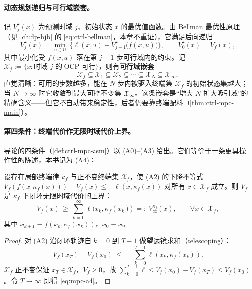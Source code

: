 \paragraph{动态规划递归与可行域嵌套。}
记 $V_j^\star(x)$ 为预测时域 $j$、初始状态 $x$ 的最优值函数。由 Bellman 最优性原理（见 \cref{ch:dp-hjb} 的 \cref{eq:ctrl-bellman}，本章不重证），它满足后向递归
\begin{equation}
  V_j^\star(x)=\min_{u\in\mathbb U}\ \big\{\ell(x,u)+V_{j-1}^\star\big(f(x,u)\big)\big\},\qquad V_0^\star(x)=V_f(x),
  \label{eq:mpc-dp-recursion}
\end{equation}
其中最小化受 $f(x,u)$ 落在第 $j-1$ 步可行域内的约束。记 $\mathcal X_j:=\{x:\text{时域 }j\text{ 的 OCP 可行}\}$，则有\textbf{可行域嵌套}
\begin{equation}
  \mathcal X_f\subseteq \mathcal X_1\subseteq \mathcal X_2\subseteq\cdots\subseteq \mathcal X_N\subseteq \mathcal X_\infty,
  \label{eq:mpc-feasible-nest}
\end{equation}
直觉清晰：可用的步数越多，能在 $N$ 步内被驱入终端集 $\mathcal X_f$ 的初始状态集越大；当 $N\to\infty$ 时它收敛到最大可控不变集 $\mathcal X_\infty$。这条嵌套是“增大 $N$ 扩大吸引域”的精确含义——但它\emph{不}自动带来稳定性，后者仍要靠终端配料（\cref{thm:ctrl-mpc-main}）。

\paragraph{第四条件：终端代价作无限时域代价上界。}
导论的四条件（\cref{def:ctrl-mpc-asm}）以 (A0)--(A3) 给出。它们等价于一条更具操作性的陈述，本书记为 (A4)：

\begin{proposition}[终端代价的无限时域上界刻画]
\label{prop:mpc-a4}
设存在局部终端律 $\kappa_f$ 与正不变终端集 $\mathcal X_f$，使 (A2) 的下降不等式 $V_f(f(x,\kappa_f(x)))-V_f(x)\le -\ell(x,\kappa_f(x))$ 对所有 $x\in\mathcal X_f$ 成立。则 $V_f$ 是 $\kappa_f$ 下闭环无限时域代价的上界：
\begin{equation}
  V_f(x)\ \ge\ \sum_{k=0}^{\infty}\ell\big(x_k,\kappa_f(x_k)\big)\ =:\ V_\infty^{\kappa_f}(x),\qquad \forall x\in\mathcal X_f,
  \label{eq:mpc-a4}
\end{equation}
其中 $x_{k+1}=f(x_k,\kappa_f(x_k))$，$x_0=x$。
\end{proposition}

\begin{proof}
对 (A2) 沿闭环轨迹自 $k=0$ 到 $T-1$ 做望远镜求和（telescoping）：
\[
  V_f(x_T)-V_f(x_0)\ \le\ -\sum_{k=0}^{T-1}\ell(x_k,\kappa_f(x_k)).
\]
$\mathcal X_f$ 正不变保证 $x_T\in\mathcal X_f$，$V_f\ge 0$，故 $\sum_{k=0}^{T-1}\ell\le V_f(x_0)-V_f(x_T)\le V_f(x_0)$。令 $T\to\infty$ 即得 \cref{eq:mpc-a4}。
\end{proof}

